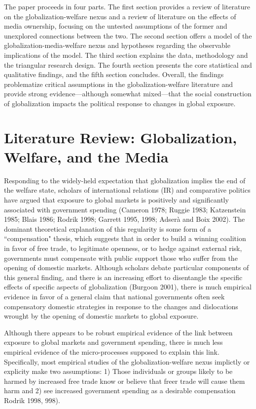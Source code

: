 \documentclass[12pt]{report}
\begin{document}
The paper proceeds in four parts. The first section provides a review of literature on the globalization-welfare nexus and a review of literature on the effects of media ownership, focusing on the untested assumptions of the former and unexplored connections between the two. The second section offers a model of the globalization-media-welfare nexus and hypotheses regarding the observable implications of the model. The third section explains the data, methodology and the triangular research design. The fourth section presents the core statistical and qualitative findings, and the fifth section concludes. Overall, the findings problematize critical assumptions in the globalization-welfare literature and provide strong evidence---although somewhat mixed---that the social construction of globalization impacts the political response to changes in global exposure.

\section{Literature Review: Globalization, Welfare, and the Media}

	Responding to the widely-held expectation that globalization implies the end of the welfare state, scholars of international relations (IR) and comparative politics have argued that exposure to global markets is positively and significantly associated with government spending (Cameron 1978; Ruggie 1983; Katzenstein 1985; Blais 1986; Rodrik 1998; Garrett 1995, 1998; Adserà and Boix 2002). The dominant theoretical explanation of this regularity is some form of a ``compensation" thesis, which suggests that in order to build a winning coalition in favor of free trade, to legitimate openness, or to hedge against external risk, governments must compensate with public support those who suffer from the opening of domestic markets. Although scholars debate particular components of this general finding, and there is an increasing effort to disentangle the specific effects of specific aspects of globalization (Burgoon 2001), there is much empirical evidence in favor of a general claim that national governments often seek compensatory domestic strategies in response to the changes and dislocations wrought by the opening of domestic markets to global exposure.
	
	Although there appears to be robust empirical evidence of the link between exposure to global markets and government spending, there is much less empirical evidence of the micro-processes supposed to explain this link. Specifically, most empirical studies of the globalization-welfare nexus implictly or explicity make two assumptions: 1) Those individuals or groups likely to be harmed by increased free trade know or believe that freer trade will cause them harm and 2) see increased government spending as a desirable compensation Rodrik 1998, 998).
	
\end{document}

